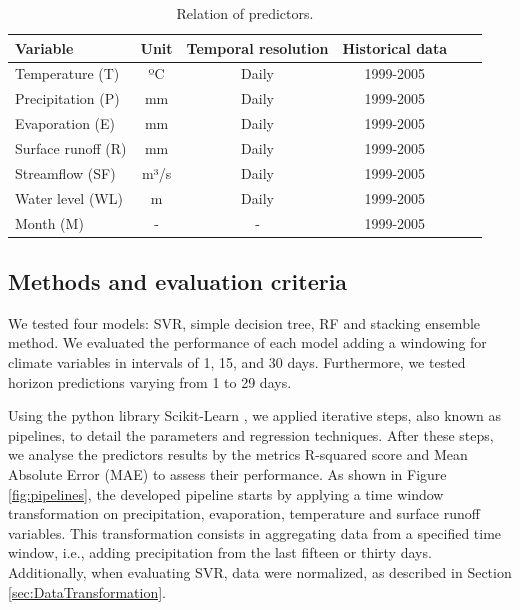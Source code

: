 \documentclass[12pt]{article}
\begin{document}
\begin{table}[htbp]
\centering
\caption{Relation of predictors.}
\label{tab:predictors}
    \renewcommand{\arraystretch}{.8}
    \small\begin{tabulary}{\textwidth}{lcCcCr}
        \toprule
            \normalsize\bfseries{Variable} &
            \normalsize\bfseries{Unit} &
            \normalsize\bfseries{Temporal resolution} &
            \normalsize\bfseries{Historical data}  \\
        \midrule
            Temperature (T)    & ºC   & Daily   & 1999-2005 \\
            Precipitation (P)  & mm   & Daily   & 1999-2005 \\
            Evaporation (E)    & mm   & Daily   & 1999-2005 \\
            Surface runoff (R) & mm   & Daily   & 1999-2005 \\
            Streamflow (SF)    & m³/s & Daily   & 1999-2005 \\
            Water level (WL)   & m    & Daily   & 1999-2005 \\
            Month (M)          & -    & -       & 1999-2005 \\
        \bottomrule
    \end{tabulary}
\end{table}


\subsection{Methods and evaluation criteria}
\label{ssec:MethodsEvaluation}

We tested four models: SVR, simple decision tree, RF and stacking ensemble method. We evaluated the performance of each model adding a windowing for climate variables in intervals of 1, 15, and 30 days. Furthermore, we tested horizon predictions varying from 1 to 29 days.

Using the python library Scikit-Learn \cite{scikit-learn}, we applied iterative steps, also known as pipelines, to detail the parameters and regression techniques. After these steps, we analyse the predictors results by the metrics R-squared score and Mean Absolute Error (MAE) to assess their performance. As shown in Figure \ref{fig:pipelines}, the developed pipeline starts by applying a time window transformation on precipitation, evaporation, temperature and surface runoff variables. This transformation consists in aggregating data from a specified time window, i.e., adding precipitation from the last fifteen or thirty days. Additionally, when evaluating SVR, data were normalized, as described in Section \ref{sec:DataTransformation}.
\end{document}
